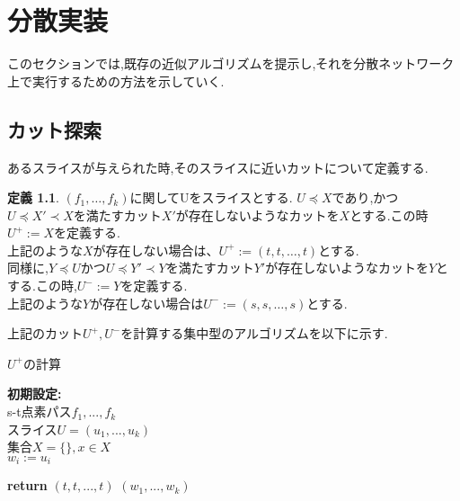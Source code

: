 \documentclass{thesis}
\theoremstyle{definition}
\newtheorem{definition}{定義}
\begin{document}
\chapter{分散実装}
このセクションでは,既存の近似アルゴリズムを提示し,それを分散ネットワーク上で実行するための方法を示していく.
\section{カット探索}
あるスライスが与えられた時,そのスライスに近いカットについて定義する.

\begin{definition}
    $(f_1, \dots ,f_k)$に関してUをスライスとする.
    $U\preceq X$であり,かつ$U\preceq X'\prec X$を満たすカット$X'$が存在しないようなカットを$X$とする.この時$U^+:=X$を定義する.\\
    上記のような$X$が存在しない場合は、$U^+:=(t,t,\dots,t)$とする.\\
    同様に,$Y\preceq U$かつ$U\preceq Y'\prec Y$を満たすカット$Y'$が存在しないようなカットを$Y$とする.この時,$U^-:=Y$を定義する.\\
    上記のような$Y$が存在しない場合は$U^-:=(s,s,\dots,s)$とする. 
\end{definition}

上記のカット$U^+,U^-$を計算する集中型のアルゴリズムを以下に示す.

\begin{algorithm}[H]
    \caption{$U^+$の計算} 
    \textbf{初期設定:} \\
    s-t点素パス$f_1,...,f_k$ \\
    スライス$U=(u_1,...,u_k)$ \\
    集合$X=\{\},x\in X$ \\
    $w_i := u_i$ \\
    {\setlength{\baselineskip}{10pt}
    \begin{algorithmic}[1]
       
      \EndFor
        \State \textbf{return} $(t,t,...,t)$
        \Else 
        \EndIf
      \EndWhile
       $(w_1,...,w_k)$
    \end{algorithmic}
    }
\end{algorithm}
\end{document}
